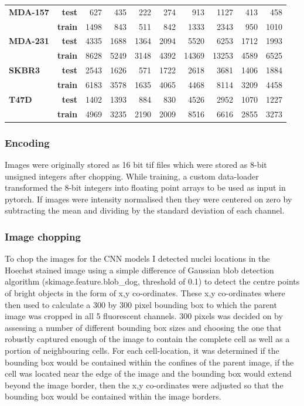 \documentclass[a4paper,11pt,twoside,openright]{scrbook}
\begin{document}
\begin{table}[h]
\begin{tabular}{lrrrrrrrrr}
\textbf{MDA-157} & \textbf{test} &    627 &    435 &          222 &    274 &         913 &        1127 &           413 &    458 \\
        & \textbf{train} &   1498 &    843 &          511 &    842 &        1333 &        2343 &           950 &   1010 \\
\textbf{MDA-231} & \textbf{test} &   4335 &   1688 &         1364 &   2094 &        5520 &        6253 &          1712 &   1993 \\
        & \textbf{train} &   8628 &   5249 &         3148 &   4392 &       14369 &       13253 &          4589 &   6525 \\
\textbf{SKBR3} & \textbf{test} &   2543 &   1626 &          571 &   1722 &        2618 &        3681 &          1406 &   1884 \\
        & \textbf{train} &   6183 &   3578 &         1635 &   4065 &        4468 &        8114 &          3209 &   4458 \\
\textbf{T47D} & \textbf{test} &   1402 &   1393 &          884 &    830 &        4526 &        2952 &          1070 &   1227 \\
        & \textbf{train} &   4969 &   3235 &         2190 &   2009 &        8516 &        6616 &          2855 &   3273 \\
\bottomrule
\end{tabular}
\end{table}

\subsubsection{Encoding}
Images were originally stored as 16 bit tif files which were stored as 8-bit unsigned integers after chopping.
While training, a custom data-loader transformed the 8-bit integers into floating point arrays to be used as input in pytorch.
If images were intensity normalised then they were centered on zero by subtracting the mean and dividing by the standard deviation of each channel.

\subsubsection{Image chopping}
To chop the images for the CNN models I detected nuclei locations in the Hoechst stained image using a simple difference of Gaussian blob detection algorithm (skimage.feature.blob\_dog, threshold of 0.1) to detect the centre points of bright objects in the form of x,y co-ordinates.
These x,y co-ordinates where then used to calculate a 300 by 300 pixel bounding box to which the parent image was cropped in all 5 fluorescent channels.
300 pixels was decided on by assessing a number of different bounding box sizes and choosing the one that robustly captured enough of the image to contain the complete cell as well as a portion of neighbouring cells.
For each cell-location, it was determined if the bounding box would be contained within the confines of the parent image, if the cell was located near the edge of the image and the bounding box would extend beyond the image border, then the x,y co-ordinates were adjusted so that the bounding box would be contained within the image borders.
\end{document}
